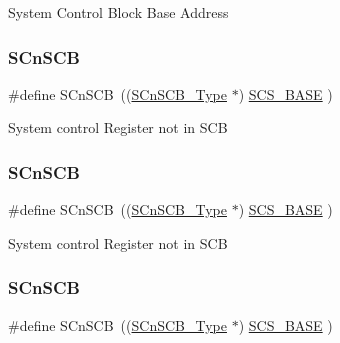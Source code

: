 System Control Block Base Address \mbox{\label{group___c_m_s_i_s__core__base_ga9fe0cd2eef83a8adad94490d9ecca63f}} 
\subsubsection{\texorpdfstring{SCnSCB}{SCnSCB}\hspace{0.1cm}{\footnotesize\ttfamily [1/8]}}
{\footnotesize\ttfamily \#define S\+Cn\+S\+CB~((\mbox{\hyperlink{struct_s_cn_s_c_b___type}{S\+Cn\+S\+C\+B\+\_\+\+Type}}    $\ast$)     \mbox{\hyperlink{group___c_m_s_i_s__core__base_ga3c14ed93192c8d9143322bbf77ebf770}{S\+C\+S\+\_\+\+B\+A\+SE}}      )}

System control Register not in S\+CB \mbox{\label{group___c_m_s_i_s__core__base_ga9fe0cd2eef83a8adad94490d9ecca63f}} 
\subsubsection{\texorpdfstring{SCnSCB}{SCnSCB}\hspace{0.1cm}{\footnotesize\ttfamily [2/8]}}
{\footnotesize\ttfamily \#define S\+Cn\+S\+CB~((\mbox{\hyperlink{struct_s_cn_s_c_b___type}{S\+Cn\+S\+C\+B\+\_\+\+Type}}    $\ast$)     \mbox{\hyperlink{group___c_m_s_i_s__core__base_ga3c14ed93192c8d9143322bbf77ebf770}{S\+C\+S\+\_\+\+B\+A\+SE}}      )}

System control Register not in S\+CB \mbox{\label{group___c_m_s_i_s__core__base_ga9fe0cd2eef83a8adad94490d9ecca63f}} 
\subsubsection{\texorpdfstring{SCnSCB}{SCnSCB}\hspace{0.1cm}{\footnotesize\ttfamily [3/8]}}
{\footnotesize\ttfamily \#define S\+Cn\+S\+CB~((\mbox{\hyperlink{struct_s_cn_s_c_b___type}{S\+Cn\+S\+C\+B\+\_\+\+Type}}    $\ast$)     \mbox{\hyperlink{group___c_m_s_i_s__core__base_ga3c14ed93192c8d9143322bbf77ebf770}{S\+C\+S\+\_\+\+B\+A\+SE}}      )}

